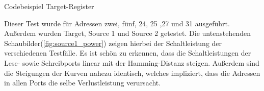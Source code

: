 \begin{algorithm}[H]
	\begin{algorithmic}[1]
		\caption{Codebeispiel Target-Register }
		\label{code:target_switching_test}
	\end{algorithmic}
\end{algorithm}

Dieser Test wurde für Adressen zwei, fünf, 24, 25 ,27 und 31 ausgeführt. Außerdem wurden Target, Source 1 und Source 2 getestet. Die untenstehenden Schaubilder(\ref{fig:source1_power}) zeigen hierbei der Schaltleistung der verschiedenen Testfälle. Es ist schön zu erkennen, dass die Schaltleistungen der Lese- sowie Schreibports linear mit der Hamming-Distanz steigen. Außerdem sind die Steigungen der Kurven nahezu identisch, welches impliziert, dass die Adressen in allen Ports die selbe Verlustleistung verursacht.\\

